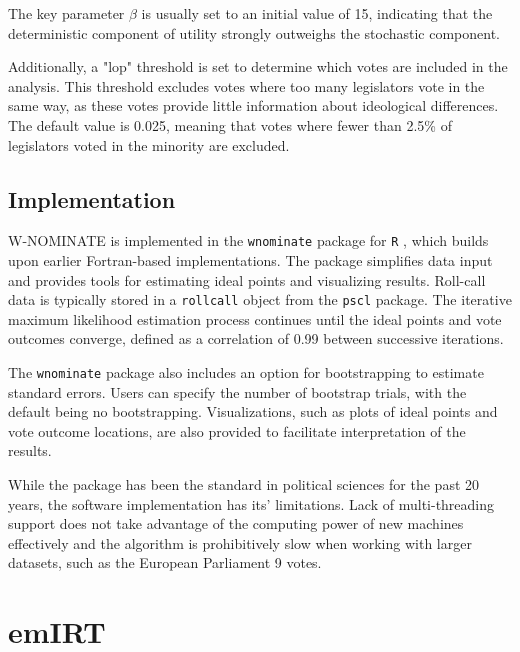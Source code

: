 \documentclass[a4paper,12pt]{report}
\begin{document}
                The key parameter \( \beta \) is usually set to an initial value of 15, indicating that the
                deterministic component of utility
                strongly outweighs the stochastic component.

                Additionally, a "lop" threshold is set to determine which votes are included in the analysis.
                This threshold excludes votes where too many legislators vote in the same way, as these votes
                provide little information about ideological differences. The default value is 0.025,
                meaning that votes where fewer than 2.5\% of legislators voted in the minority are excluded.

            \subsection{Implementation}
                W-NOMINATE is implemented in the \texttt{wnominate} package for \texttt{R}
                , which builds upon earlier Fortran-based implementations. The package simplifies data input and
                provides tools for estimating ideal points and visualizing results. Roll-call data is typically
                stored in a \texttt{rollcall} object from the \texttt{pscl}
                package. The iterative maximum likelihood estimation process continues until the ideal points
                and vote outcomes converge, defined as a correlation of 0.99 between successive iterations.

                The \texttt{wnominate}
                package also includes an option for bootstrapping to estimate standard errors. Users can specify
                the number of bootstrap trials, with the default being no bootstrapping. Visualizations, such as
                plots of ideal points and vote outcome locations, are also provided to facilitate interpretation
                of the results.

                While the package has been the standard in political sciences for the past 20 years, the software
                implementation has its' limitations. Lack of multi-threading support does not take advantage of the
                computing power of new machines effectively and the algorithm is prohibitively slow when working
                with larger datasets, such as the European Parliament 9 votes.


        \section{emIRT}
\end{document}

